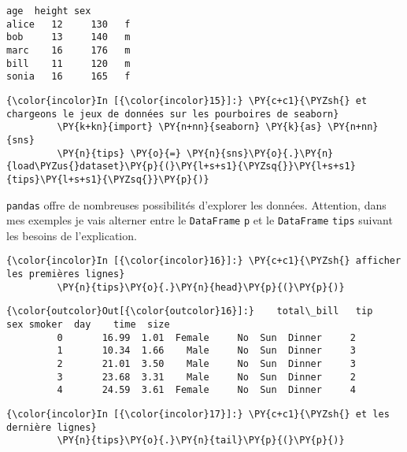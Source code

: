     \begin{Verbatim}[commandchars=\\\{\},frame=single,framerule=0.3mm,rulecolor=\color{cellframecolor}]
       age  height sex
alice   12     130   f
bob     13     140   m
marc    16     176   m
bill    11     120   m
sonia   16     165   f
\end{Verbatim}

    \begin{Verbatim}[commandchars=\\\{\},frame=single,framerule=0.3mm,rulecolor=\color{cellframecolor}]
{\color{incolor}In [{\color{incolor}15}]:} \PY{c+c1}{\PYZsh{} et chargeons le jeux de données sur les pourboires de seaborn}
         \PY{k+kn}{import} \PY{n+nn}{seaborn} \PY{k}{as} \PY{n+nn}{sns}
         \PY{n}{tips} \PY{o}{=} \PY{n}{sns}\PY{o}{.}\PY{n}{load\PYZus{}dataset}\PY{p}{(}\PY{l+s+s1}{\PYZsq{}}\PY{l+s+s1}{tips}\PY{l+s+s1}{\PYZsq{}}\PY{p}{)}
\end{Verbatim}


    \texttt{pandas} offre de nombreuses possibilités d'explorer les données.
Attention, dans mes exemples je vais alterner entre le
\texttt{DataFrame} \texttt{p} et le \texttt{DataFrame} \texttt{tips}
suivant les besoins de l'explication.

    \begin{Verbatim}[commandchars=\\\{\},frame=single,framerule=0.3mm,rulecolor=\color{cellframecolor}]
{\color{incolor}In [{\color{incolor}16}]:} \PY{c+c1}{\PYZsh{} afficher les premières lignes}
         \PY{n}{tips}\PY{o}{.}\PY{n}{head}\PY{p}{(}\PY{p}{)}
\end{Verbatim}


\begin{Verbatim}[commandchars=\\\{\},frame=single,framerule=0.3mm,rulecolor=\color{cellframecolor}]
{\color{outcolor}Out[{\color{outcolor}16}]:}    total\_bill   tip     sex smoker  day    time  size
         0       16.99  1.01  Female     No  Sun  Dinner     2
         1       10.34  1.66    Male     No  Sun  Dinner     3
         2       21.01  3.50    Male     No  Sun  Dinner     3
         3       23.68  3.31    Male     No  Sun  Dinner     2
         4       24.59  3.61  Female     No  Sun  Dinner     4
\end{Verbatim}
            
    \begin{Verbatim}[commandchars=\\\{\},frame=single,framerule=0.3mm,rulecolor=\color{cellframecolor}]
{\color{incolor}In [{\color{incolor}17}]:} \PY{c+c1}{\PYZsh{} et les dernière lignes}
         \PY{n}{tips}\PY{o}{.}\PY{n}{tail}\PY{p}{(}\PY{p}{)}
\end{Verbatim}



